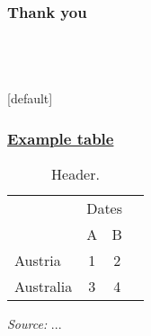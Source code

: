 \documentclass[12pt, ngerman]{beamer}
\begin{document}
\section{}
\begin{frame}
\frametitle{Thank you}
 \\
\vspace{0.5cm}
\end{frame}

\showpagenumbersfalse


\section{}

\makeatletter
    [default]
    \def\beamer@entrycode{\vspace*{-\headheight}}
\makeatother
\begin{frame}[label=ex_table,noframenumbering]
\frametitle{\hyperlink{introapp}{Example table}}
\begin{table} %
\vspace{-0.5cm}
\scriptsize %
\setlength\tabcolsep{3.5pt}
\centering
\begin{threeparttable}
\caption{Header.} \label{tab:header}
\begin{tabular}{l *{3}{c}}
\hline
\addlinespace \multicolumn{1}{l}{Country} & \multicolumn{2}{c}{Dates} \\
\cmidrule(lr){2-3}
&\multicolumn{1}{c}{A}&\multicolumn{1}{c}{B} \\
\hline
\addlinespace
Austria&         1&         2\\
Australia&         3&         4\\
\hline
\end{tabular}
\begin{tablenotes}
\item \textit{Source:} ...
\end{tablenotes}
\end{threeparttable}
\end{table}
\vspace{0.5cm}
\hyperlink{ex_slide}{} \\
\end{frame}
\end{document}
